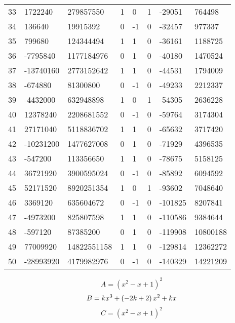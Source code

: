 \documentclass{amsart}
\begin{document}
\begin{longtable}{|l|l|l|lllll|}
33&1722240&279857550&1&0&1&-29051&764498\\
34&136640&19915392&0&-1&0&-32457&977337\\
35&799680&124344494&1&1&0&-36161&1188725\\
36&-7795840&1177184976&0&1&0&-40180&1470524\\
37&-13740160&2773152642&1&1&0&-44531&1794009\\
38&-674880&81300800&0&-1&0&-49233&2212337\\
39&-4432000&632948898&1&0&1&-54305&2636228\\
40&12378240&2208681552&0&-1&0&-59764&3174304\\
41&27171040&5118836702&1&1&0&-65632&3717420\\
42&-10231200&1477627008&0&1&0&-71929&4396535\\
43&-547200&113356650&1&1&0&-78675&5158125\\
44&36721920&3900595024&0&-1&0&-85892&6094592\\
45&52171520&8920251354&1&0&1&-93602&7048640\\
46&3369120&635604672&0&-1&0&-101825&8207841\\
47&-4973200&825807598&1&1&0&-110586&9384644\\
48&-597120&87385200&0&1&0&-119908&10800188\\
49&77009920&14822551158&1&1&0&-129814&12362272\\
50&-28993920&4179982976&0&-1&0&-140329&14221209\\
\hline
\end{longtable}
$$A=(x^2
 - x
 + 1)^{2}$$
$$B=k\*x^3
 + \left(-2\*k
 + 2\right) \*x^2
 + k\*x$$
$$C=(x^2
 - x
 + 1)^{2}$$
\end{document}
